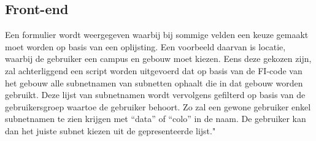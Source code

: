 \subsection{Front-end}
Een formulier wordt weergegeven waarbij bij sommige velden een keuze gemaakt moet worden op basis van een oplijsting.
Een voorbeeld daarvan is locatie, waarbij de gebruiker een campus en gebouw moet kiezen. Eens deze gekozen zijn, zal achterliggend een script worden uitgevoerd dat op basis van de FI-code van het gebouw alle subnetnamen van subnetten ophaalt die in dat gebouw worden gebruikt. Deze lijst van subnetnamen wordt vervolgens gefilterd op basis van de gebruikersgroep waartoe de gebruiker behoort. Zo zal een gewone gebruiker enkel subnetnamen te zien krijgen met “data” of “colo” in de naam. De gebruiker kan dan het juiste subnet kiezen uit de gepresenteerde lijst."

